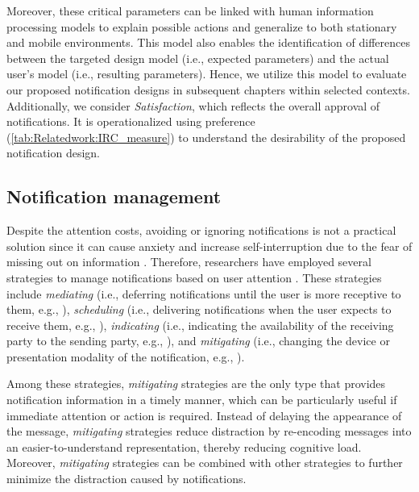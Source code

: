 Moreover, these critical parameters can be linked with human information processing models \cite{mccrickard_model_2003} to explain possible actions and generalize to both stationary and mobile environments. This model also enables the identification of differences between the targeted design model (i.e., expected parameters) and the actual user's model (i.e., resulting parameters). Hence, we utilize this model to evaluate our proposed notification designs in subsequent chapters within selected contexts. Additionally, we consider \textit{Satisfaction}, which reflects the overall approval of notifications. It is operationalized using preference \cite{mccrickard_attuning_2003} (\autoref{tab:Relatedwork:IRC_measure}) to understand the desirability \cite{norman_psychological_1986} of the proposed notification design.
 

\subsection{Notification management}
\label{sec:Relatedwork:notification_management}

Despite the attention costs, avoiding or ignoring notifications is not a practical solution since it can cause anxiety and increase self-interruption due to the fear of missing out on information \cite{pielot_productive_2017, iqbal_notifications_2010}. Therefore, researchers have employed several strategies to manage notifications based on user attention \cite{anderson_survey_2018, mehrotra_intelligent_2018}. These strategies include \textit{mediating} (i.e., deferring notifications until the user is more receptive to them, e.g., \cite{okoshi_reducing_2015, pielot_beyond_2017, bailey_need_2006}), \textit{scheduling} (i.e., delivering notifications when the user expects to receive them, e.g., \cite{weber_snooze_2018, sarker_assessing_2014}), \textit{indicating} (i.e., indicating the availability of the receiving party to the sending party, e.g., \cite{zuger_reducing_2017, begole_lilsys_2004}), and \textit{mitigating} (i.e., changing the device or presentation modality of the notification, e.g., \cite{weber_situ_2016, lopez_tovar_managing_2015, zulkernain_mobile_2010, streefkerk_designing_2006}).

Among these strategies, \textit{mitigating} strategies are the only type that provides notification information in a timely manner, which can be particularly useful if immediate attention or action is required. Instead of delaying the appearance of the message, \textit{mitigating} strategies reduce distraction by re-encoding messages into an easier-to-understand representation, thereby reducing cognitive load. Moreover, \textit{mitigating} strategies can be combined with other strategies to further minimize the distraction caused by notifications.

